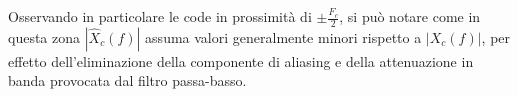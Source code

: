 \documentclass[12pt]{article}
\begin{document}
Osservando in particolare le code in prossimità di $\pm\frac{F_{c}}{2}$, si può notare come in questa zona $|\hat{X}_{c}(f)|$ assuma valori generalmente minori rispetto a $|X_{c}(f)|$, per effetto dell'eliminazione della componente di aliasing e della attenuazione in banda provocata dal filtro passa-basso.
\end{document}
